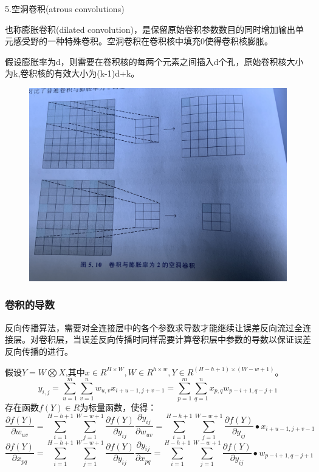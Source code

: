 \documentclass[openbib]{article}
\begin{document}
5.空洞卷积(atrous convolutions)

也称膨胀卷积(dilated convolution)，是保留原始卷积参数数目的同时增加输出单元感受野的一种特殊卷积。空洞卷积在卷积核中填充0使得卷积核膨胀。

假设膨胀率为d，则需要在卷积核的每两个元素之间插入d个孔，原始卷积核大小为k,卷积核的有效大小为(k-1)d+k。
\begin{figure}
	\centering
	\includegraphics[scale=0.05]{空洞卷积}
\end{figure}

\subsubsection{卷积的导数}

反向传播算法，需要对全连接层中的各个参数求导数才能继续让误差反向流过全连接层。对卷积层，当误差反向传播时同样需要计算卷积层中参数的导数以保证误差反向传播的进行。

假设$Y=W\bigotimes X$,其中$x \in R^{H\times W},W\in R^{h\times w},Y\in R^{(H-h+1)\times (W-w+1)}$。
$$y_{i,j} = \sum_{u=1}^{m}\sum_{v=1}^{n}w_{u,v}x_{i+u-1,j+v-1}=\sum_{p=1}^{m}\sum_{q=1}^{n}x_{p,q}w_{p-i+1,q-j+1}$$
存在函数$f(Y)\in R$为标量函数，使得：
$$\frac{\partial f(Y)}{\partial w_{uv}}=\sum_{i=1}^{H-h+1}\sum_{j=1}^{W-w+1}\frac{\partial f(Y)}{\partial y_{ij}}\frac{\partial y_{ij}}{\partial w_{uv}}=\sum_{i=1}^{H-h+1}\sum_{j=1}^{W-w+1}\frac{\partial f(Y)}{\partial y_{ij}}\bullet x_{i+u-1,j+v-1}$$
$$\frac{\partial f(Y)}{\partial x_{pq}}=\sum_{i=1}^{H-h+1}\sum_{j=1}^{W-w+1}\frac{\partial f(Y)}{\partial y_{ij}}\frac{\partial y_{ij}}{\partial x_{pq}}=\sum_{i=1}^{H-h+1}\sum_{j=1}^{W-w+1}\frac{\partial f(Y)}{\partial y_{ij}}\bullet w_{p-i+1,q-j+1}$$
\end{document}
